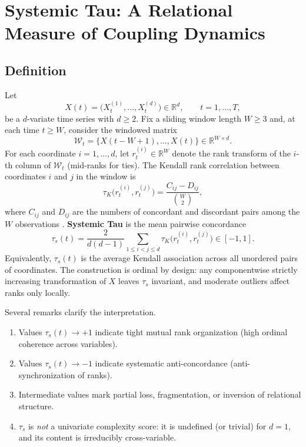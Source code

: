 \documentclass[11pt,a4paper]{article}
\begin{document}
\section{Systemic Tau: A Relational Measure of Coupling Dynamics}
\label{sec:systemic_tau}


\subsection{Definition}

Let
\begin{equation}
X(t)=\bigl(X^{(1)}_t,\ldots,X^{(d)}_t\bigr)\in\mathbb{R}^{d},\qquad
t=1,\ldots,T,
\end{equation}
be a $d$-variate time series with $d\geq 2$. Fix a sliding window length
$W\geq 3$ and, at each time $t\geq W$, consider the windowed matrix
\begin{equation}
\mathcal{W}_t
=\bigl\{X(t-W+1),\ldots,X(t)\bigr\}\in\mathbb{R}^{W\times d}.
\end{equation}
For each coordinate $i=1,\ldots,d$, let $r^{(i)}_t\in\mathbb{R}^{W}$ denote
the rank transform of the $i$-th column of $\mathcal{W}_t$ (mid-ranks for
ties). The Kendall rank correlation between coordinates $i$ and $j$ in the
window is
\begin{equation}
\label{eq:kendall}
\tau_K\bigl(r^{(i)}_t,r^{(j)}_t\bigr)
=\frac{C_{ij}-D_{ij}}{\binom{W}{2}},
\end{equation}
where $C_{ij}$ and $D_{ij}$ are the numbers of concordant and discordant
pairs among the $W$ observations \cite{Kendall1938}. \textbf{Systemic Tau}
is the mean pairwise concordance
\begin{equation}
\label{eq:tau_s}
\tau_s(t)
=\frac{2}{d(d-1)}
\sum_{1\leq i<j\leq d}
\tau_K\bigl(r^{(i)}_t,r^{(j)}_t\bigr)
\in[-1,1].
\end{equation}
Equivalently, $\tau_s(t)$ is the average Kendall association across all
unordered pairs of coordinates. The construction is ordinal by design:
any componentwise strictly increasing transformation of $X$ leaves
$\tau_s$ invariant, and moderate outliers affect ranks only locally.

Several remarks clarify the interpretation.
\begin{enumerate}[leftmargin=*,itemsep=2pt]
  \item Values $\tau_s(t)\to +1$ indicate tight mutual rank organization
  (high ordinal coherence across variables).
  \item Values $\tau_s(t)\to -1$ indicate systematic anti-concordance
  (anti-synchronization of ranks).
  \item Intermediate values mark partial loss, fragmentation, or
  inversion of relational structure.
  \item $\tau_s$ is \emph{not} a univariate complexity score: it is
  undefined (or trivial) for $d=1$, and its content is irreducibly
  cross-variable.
\end{enumerate}
\end{document}
